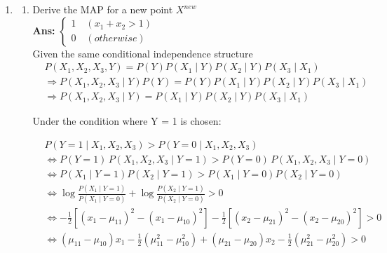 \documentclass{article}
\theoremstyle{definition}
\theoremstyle{remark}
\begin{document}
\begin{enumerate}[font={\Large\bfseries},left=0pt]
\begin{tcolorbox}
\begin{enumerate}
\begin{enumerate}
\begin{enumerate}
				            \end{enumerate}
			      \end{enumerate}
			\item \begin{enumerate}
				      \item Derive the MAP for a new point $X^{new}$ \\
				            \textbf{Ans: } $\begin{cases} 1 \quad (x_1 + x_2 > 1) \\ 0 \quad(otherwise) \end{cases}$ \\
				            Given the same conditional independence structure
				            \begin{align}
					             & P(X_1, X_2, X_3, Y) = P(Y)P(X_1 \mid Y)P(X_2 \mid Y)P(X_3 \mid X_1)                     \\
					             & \Rightarrow P(X_1, X_2, X_3 \mid Y)P(Y) = P(Y)P(X_1 \mid Y)P(X_2 \mid Y)P(X_3 \mid X_1) \\
					             & \Rightarrow P(X_1, X_2, X_3 \mid Y) = P(X_1 \mid Y)P(X_2 \mid Y)P(X_3 \mid X_1)
				            \end{align}

				            Under the condition where Y = 1 is chosen:

				            \begin{align}
					             & P(Y=1 \mid X_1,X_2,X_3) > P(Y=0 \mid X_1,X_2,X_3)                                                                                \\
					             & \iff P(Y=1)\,P(X_1,X_2,X_3 \mid Y=1) > P(Y=0)\,P(X_1,X_2,X_3 \mid Y=0)                                                           \\
					             & \iff P(X_1\mid Y=1)P(X_2\mid Y=1) > P(X_1\mid Y=0)P(X_2\mid Y=0)                                                                 \\
					             & \iff \log\frac{P(X_1\mid Y=1)}{P(X_1\mid Y=0)} + \log\frac{P(X_2\mid Y=1)}{P(X_2\mid Y=0)} > 0                                   \\
					             & \iff -\tfrac12\!\left[(x_1-\mu_{11})^2 - (x_1-\mu_{10})^2\right] -\tfrac12\!\left[(x_2-\mu_{21})^2 - (x_2-\mu_{20})^2\right] > 0 \\
					             & \iff (\mu_{11}-\mu_{10})x_1 - \tfrac12(\mu_{11}^2-\mu_{10}^2) + (\mu_{21}-\mu_{20})x_2 - \tfrac12(\mu_{21}^2-\mu_{20}^2) > 0
				            \end{align}


\end{enumerate}
\end{enumerate}
\end{tcolorbox}
\end{enumerate}
\end{document}
